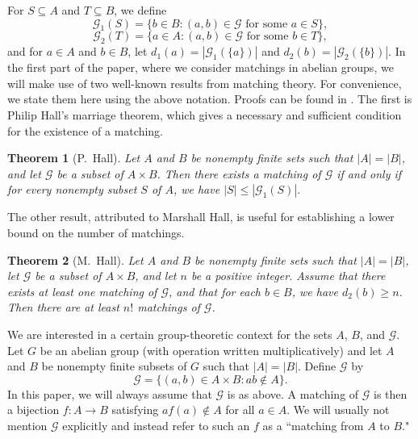 \documentclass[11pt]{amsart}
\newtheorem{theorem}{Theorem}[section]
\theoremstyle{definition}
\theoremstyle{remark}
\begin{document}
For \( S \subseteq A \) and \( T \subseteq B \), we define 
\[ \mathcal{G}_1(S) = \{ b \in B :  (a,b) \in \mathcal{G}\mbox{ for some }a \in S \}, \]
\[ \mathcal{G}_2(T) = \{ a \in A :  (a,b) \in \mathcal{G}\mbox{ for some }b \in T \}, \]
and for \( a \in A \) and \( b \in B \), let \(d_1(a) = |\mathcal{G}_1(\{ a \})| \) and \(d_2(b) = |\mathcal{G}_2(\{ b \})| \).  In the first part of the paper, where we consider matchings in abelian groups, we will make use of two well-known results from matching theory. For convenience, we state them here using the above notation. Proofs can be found in \cite{Lovasz}. The first is Philip Hall's marriage theorem, which gives a necessary and sufficient condition for the existence of a matching. 


\begin{theorem}[P.\ Hall]  \label{PhiliplHall}
Let \( A \) and \( B \) be nonempty finite sets such that \( |A| = |B| \), and let \( \mathcal{G} \) be a subset of \( A \times B \). Then there exists a matching of \( \mathcal{G} \) if and only if for every nonempty subset \( S \) of \( A \), we have \( |S| \leq | \mathcal{G}_1(S)|. \)
\end{theorem}


The other result, attributed to Marshall Hall, is useful for establishing a lower bound on the number of matchings. 


\begin{theorem}[M.\ Hall]  \label{MarshallHall}
Let \( A \) and \( B \) be nonempty finite sets such that \( |A| = |B| \), let \( \mathcal{G} \) be a subset of \( A \times B \), and let \( n \) be a positive integer. Assume that there exists at least one matching of \( \mathcal{G} \), and that for each \( b \in B \), we have \( d_2(b) \geq n \). Then there are at least \( n! \) matchings of \( \mathcal{G} \).
\end{theorem}


We are interested in a certain group-theoretic context for the sets \( A \), \( B \), and \( \mathcal{G} \). Let \( G \) be an abelian group (with operation written multiplicatively) and let \( A \) and \( B \) be nonempty finite subsets of \( G \) such that \( |A| = |B| \). Define \( \mathcal{G} \) by 
\[  \mathcal{G} = \{ (a,b) \in A \times B : ab \notin A \}. \]
In this paper, we will always assume that \( \mathcal{G} \) is as above. A matching of \( \mathcal{G} \) is then a bijection \( f : A \longrightarrow B \) satisfying \( af(a) \notin A \) for all \( a \in A \). We will usually not mention \( \mathcal{G} \) explicitly and instead refer to such an \( f \) as a ``matching from \( A \) to \( B \)."  
\end{document}
